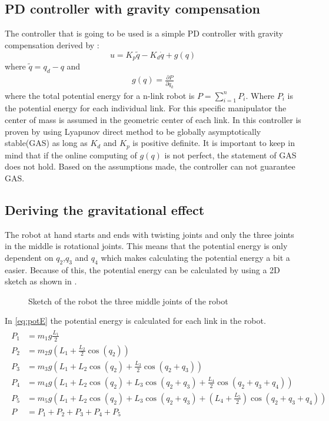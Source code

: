\subsection{PD controller with gravity compensation}

The controller that is going to be used is a simple PD controller with gravity compensation derived by \cite{spong}:
$$
    u=K_p\tilde{q} - K_d\dot{q} +g(q)
$$
 where $\tilde{q} = q_d - q$ and 
 \begin{align}\label{eq:gravity}
 g(q) = \frac{\partial P}{\partial q_k}
 \end{align}
 where the total potential energy for a n-link robot is $P = \sum^n_{i=1}P_i$. Where $P_i$ is the potential energy for each individual link. For this specific manipulator the center of mass is assumed in the geometric center of each link. In \cite{Siciliano} this controller is proven by using Lyapunov direct method to be globally asymptotically stable(GAS) as long as $K_d$ and $K_p$ is positive definite. It is important to keep in mind that if the online computing of $g(q)$ is not perfect, the statement of GAS does not hold. Based on the assumptions made, the controller can not guarantee GAS. 
 
 \subsection{Deriving the gravitational effect}
 The robot at hand starts and ends with twisting joints and only the three joints in the middle is rotational joints. This means that the potential energy is only dependent on $q_2$,$q_3$ and $q_4$ which makes calculating the potential energy a bit a easier. Because of this, the potential energy can be calculated by using a 2D sketch as shown in .

\begin{figure}[htbp]
    \centering
    
    \caption{Sketch of the robot the three middle joints of the robot}
    \label{draw:pot-rob}
\end{figure}
     
In \eqref{eq:potE} the potential energy is calculated for each link in the robot. 
 \begin{align}
    \begin{split}\label{eq:potE}
        P_1 &= m_1g\frac{L_1}{2}
        \\
        P_2 &= m_2g\left(L_1 + \frac{L_2}{2}\cos{(q_2)}\right)
        \\
        P_3 &= m_3g\left(L_1 +  L_2 \cos{(q_2)} + \frac{L_3}{2}\cos{(q_2 + q_3)} \right)
        \\
        P_4 &= m_4g\left(L_1 +  L_2 \cos{(q_2)} + L_3\cos{(q_2 + q_3)} + \frac{L_4}{2}\cos{(q_2+q_3+q_4)} \right)
        \\
        P_5 &=m_5g\left(L_1 +  L_2 \cos{(q_2)} + L_3\cos{(q_2 + q_3)} + \left(L_4 + \frac{L_5}{2} \right)\cos{(q_2+q_3+q_4)} \right)
        \\
        P &= P_1 + P_2 + P_3 + P_4 + P_5
    \end{split}   
 \end{align}    


